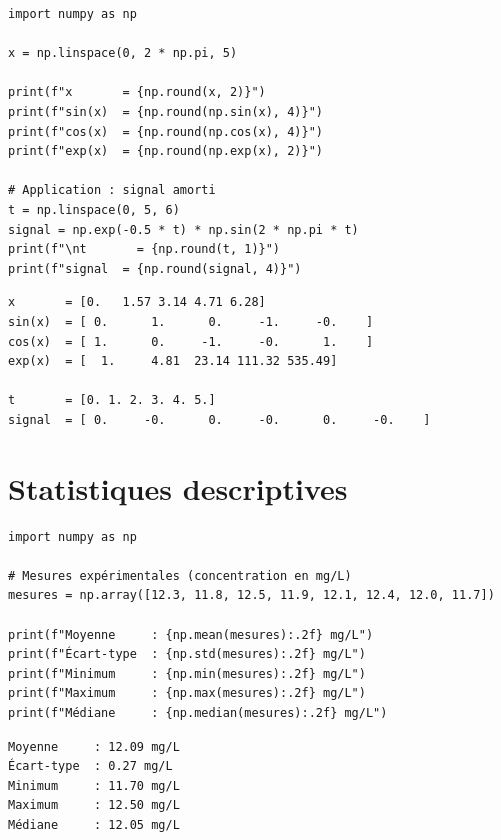 \begin{codeblock}[title=\textbf{Python}]
\begin{verbatim}
import numpy as np

x = np.linspace(0, 2 * np.pi, 5)

print(f"x       = {np.round(x, 2)}")
print(f"sin(x)  = {np.round(np.sin(x), 4)}")
print(f"cos(x)  = {np.round(np.cos(x), 4)}")
print(f"exp(x)  = {np.round(np.exp(x), 2)}")

# Application : signal amorti
t = np.linspace(0, 5, 6)
signal = np.exp(-0.5 * t) * np.sin(2 * np.pi * t)
print(f"\nt       = {np.round(t, 1)}")
print(f"signal  = {np.round(signal, 4)}")
\end{verbatim}
\end{codeblock}

\begin{codeoutput}
\begin{verbatim}
x       = [0.   1.57 3.14 4.71 6.28]
sin(x)  = [ 0.      1.      0.     -1.     -0.    ]
cos(x)  = [ 1.      0.     -1.     -0.      1.    ]
exp(x)  = [  1.     4.81  23.14 111.32 535.49]

t       = [0. 1. 2. 3. 4. 5.]
signal  = [ 0.     -0.      0.     -0.      0.     -0.    ]
\end{verbatim}
\end{codeoutput}

\section{Statistiques descriptives}

\begin{codeblock}[title=\textbf{Python}]
\begin{verbatim}
import numpy as np

# Mesures expérimentales (concentration en mg/L)
mesures = np.array([12.3, 11.8, 12.5, 11.9, 12.1, 12.4, 12.0, 11.7])

print(f"Moyenne     : {np.mean(mesures):.2f} mg/L")
print(f"Écart-type  : {np.std(mesures):.2f} mg/L")
print(f"Minimum     : {np.min(mesures):.2f} mg/L")
print(f"Maximum     : {np.max(mesures):.2f} mg/L")
print(f"Médiane     : {np.median(mesures):.2f} mg/L")
\end{verbatim}
\end{codeblock}

\begin{codeoutput}
\begin{verbatim}
Moyenne     : 12.09 mg/L
Écart-type  : 0.27 mg/L
Minimum     : 11.70 mg/L
Maximum     : 12.50 mg/L
Médiane     : 12.05 mg/L
\end{verbatim}
\end{codeoutput}


